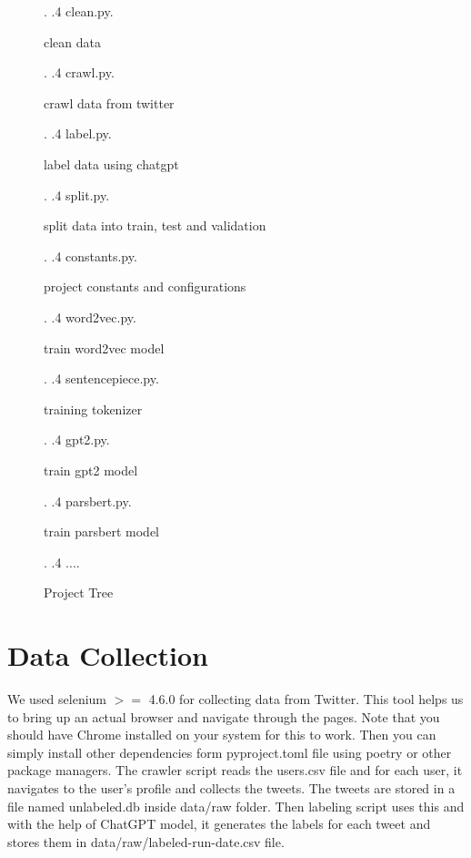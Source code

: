 \documentclass[12pt, letterpaper]{article}
\begin{document}
\begin{figure}[H]
{\begin{minipage}[t]{5cm}
            \end{minipage}.
            .4 clean.py.\dotfill\begin{minipage}[t]{5cm}
                                    clean data
            \end{minipage}.
            .4 crawl.py.\dotfill\begin{minipage}[t]{5cm}
                                    crawl data from twitter
            \end{minipage}.
            .4 label.py.\dotfill\begin{minipage}[t]{5cm}
                                    label data using chatgpt
            \end{minipage}.
            .4 split.py.\dotfill\begin{minipage}[t]{5cm}
                                    split data into train, test and validation
            \end{minipage}.
            .4 constants.py.\dotfill\begin{minipage}[t]{5cm}
                                        project constants and configurations
            \end{minipage}.
            .4 word2vec.py.\dotfill\begin{minipage}[t]{5cm}
                                       train word2vec model
            \end{minipage}.
            .4 sentencepiece.py.\dotfill\begin{minipage}[t]{5cm}
                                        training tokenizer
            \end{minipage}.
            .4 gpt2.py.\dotfill\begin{minipage}[t]{5cm}
                                   train gpt2 model
            \end{minipage}.
            .4 parsbert.py.\dotfill\begin{minipage}[t]{5cm}
                                       train parsbert model
            \end{minipage}.
            .4 ....
        }
        \caption{Project Tree}
    \end{figure}


    \section{Data Collection}\label{sec:data-collection}
    We used selenium $>=$ 4.6.0 for collecting data from Twitter. This tool helps us to bring up an actual browser and navigate through the pages. Note that you should have Chrome installed on your system for this to work. Then you can simply install other dependencies form pyproject.toml file using poetry or other package managers.
    The crawler script reads the users.csv file and for each user, it navigates to the user's profile and collects the tweets. The tweets are stored in a file named unlabeled.db inside data\slash raw folder. Then labeling script uses this and with the help of ChatGPT model, it generates the labels for each tweet and stores them in data\slash raw\slash labeled-run-date.csv file.
\end{document}
